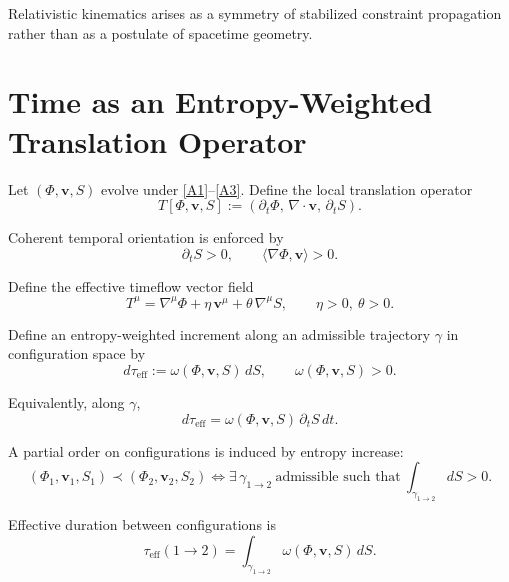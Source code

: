 \documentclass[11pt]{article}
\begin{document}
Relativistic kinematics arises as a symmetry of stabilized constraint propagation rather than as a postulate of spacetime geometry.

\section{Time as an Entropy-Weighted Translation Operator}

Let $(\Phi,\mathbf{v},S)$ evolve under \eqref{A1}--\eqref{A3}. Define the local translation operator
\begin{equation}
T[\Phi,\mathbf{v},S]
:=
\left(
\partial_t \Phi,\,
\nabla\cdot\mathbf{v},\,
\partial_t S
\right).
\label{D1}
\end{equation}

Coherent temporal orientation is enforced by
\begin{equation}
\partial_t S > 0,
\qquad
\langle \nabla\Phi,\mathbf{v}\rangle > 0.
\label{D2}
\end{equation}

Define the effective timeflow vector field
\begin{equation}
T^\mu
=
\nabla^\mu \Phi
+
\eta\,\mathbf{v}^\mu
+
\theta\,\nabla^\mu S,
\qquad
\eta>0,\ \theta>0.
\label{D3}
\end{equation}

Define an entropy-weighted increment along an admissible trajectory $\gamma$ in configuration space by
\begin{equation}
d\tau_{\mathrm{eff}}
:=
\omega(\Phi,\mathbf{v},S)\, dS,
\qquad
\omega(\Phi,\mathbf{v},S)>0.
\label{D4}
\end{equation}

Equivalently, along $\gamma$,
\begin{equation}
d\tau_{\mathrm{eff}}
=
\omega(\Phi,\mathbf{v},S)\, \partial_t S\, dt.
\label{D5}
\end{equation}

A partial order on configurations is induced by entropy increase:
\begin{equation}
(\Phi_1,\mathbf{v}_1,S_1)\prec(\Phi_2,\mathbf{v}_2,S_2)
\iff
\exists\,\gamma_{1\to2}\ \text{admissible such that}\ 
\int_{\gamma_{1\to2}} dS > 0.
\label{D6}
\end{equation}

Effective duration between configurations is
\begin{equation}
\tau_{\mathrm{eff}}(1\to2)
=
\int_{\gamma_{1\to2}}
\omega(\Phi,\mathbf{v},S)\, dS.
\label{D7}
\end{equation}
\end{document}
